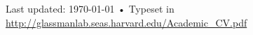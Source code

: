 \documentclass[10pt, a4paper]{article}
\begin{document}





 









\vfill{}

\begin{center}
{\scriptsize  Last updated: \today\- •\- 
Typeset in \href{http://nitens.org/taraborelli/cvtex}{
\XeTeX }\\
\href{http://glassmanlab.seas.harvard.edu/Academic_CV.pdf}{http://glassmanlab.seas.harvard.edu/Academic\_CV.pdf}}
\end{center}
\end{document}
